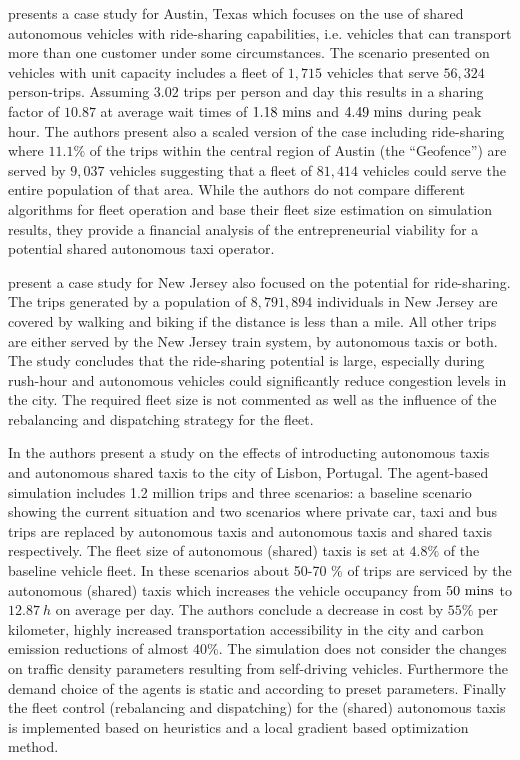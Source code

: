 \cite{fagnant2015dynamic} presents a case study for Austin, Texas which focuses on the use of shared autonomous vehicles with ride-sharing capabilities, i.e. vehicles that can transport more than one customer under some circumstances. The scenario presented on vehicles with unit capacity includes a fleet of $1,715$ vehicles that serve $56,324$ person-trips. Assuming $3.02$ trips per person and day this results in a sharing factor of $10.87$ at average wait times of $1.18 ~ \textnormal{mins}$ and $4.49 ~ \textnormal{mins}$ during peak hour. The authors present also a scaled version of the case including ride-sharing where $11.1\%$ of the trips within the central region of Austin (the ``Geofence'') are served by $9,037$ vehicles suggesting that a fleet of $81,414$ vehicles could serve the entire population of that area. While the authors do not compare different algorithms for fleet operation and base their fleet size estimation on simulation results, they provide a financial analysis of the entrepreneurial viability for a potential shared autonomous taxi operator.

\cite{zachariah2014uncongested} present a case study for New Jersey also focused on the potential for ride-sharing. The trips generated by a population of $8,791,894$ individuals in New Jersey are covered by walking and biking if the distance is less than a mile. All other trips are either served by the New Jersey train system, by autonomous taxis or both. The study concludes that the ride-sharing potential is large, especially during rush-hour and autonomous vehicles could significantly reduce congestion levels in the city. The required fleet size is not commented as well as the influence of the rebalancing and dispatching strategy for the fleet.

In \cite{martinez2017assessing} the authors present a study on the effects of introducting autonomous taxis and autonomous shared taxis to the city of Lisbon, Portugal. The agent-based simulation includes 1.2 million trips and three scenarios: a baseline scenario showing the current situation and two scenarios where private car, taxi and bus trips are replaced by autonomous taxis and autonomous taxis and shared taxis respectively. The fleet size of autonomous (shared) taxis is set at $4.8\%$ of the baseline vehicle fleet. In these scenarios about 50-70 \% of trips are serviced by the autonomous (shared) taxis which increases the vehicle occupancy from $50 ~ \textnormal{mins}$ to $12.87 ~ h$ on average per day. The authors conclude a decrease in cost by $55 \%$ per kilometer, highly increased transportation accessibility in the city and carbon emission reductions of almost $40\%$. The simulation does not consider the changes on traffic density parameters resulting from self-driving vehicles. Furthermore the demand choice of the agents is static and according to preset parameters. Finally the fleet control (rebalancing and dispatching) for the (shared) autonomous taxis is implemented based on heuristics and a local gradient based optimization method.

